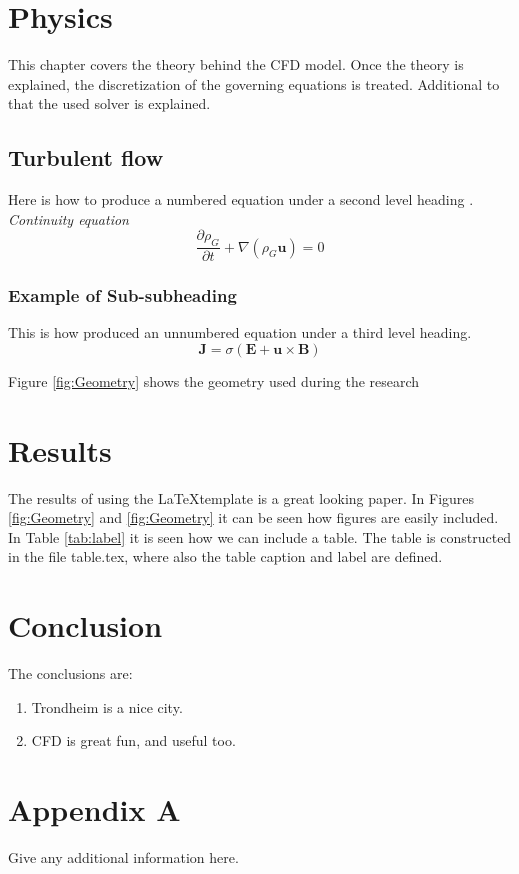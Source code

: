 \documentclass{CFD2017}
\begin{document}
\section{Physics}
This chapter covers the theory behind the CFD model. Once the theory is explained, the discretization of the governing equations is treated. Additional to that the used solver is explained.

\subsection{Turbulent flow}
Here is how to produce a numbered equation under a second level
heading \cite{James1988}.
\vspace{2cm}\\
\emph{Continuity equation}
\begin{equation}
  \frac{\partial \rho_G}{\partial t}+\nabla\left(\rho_G\mathbf
    u\right)=0
\end{equation}

\subsubsection*{Example of Sub-subheading}
This is how \cite{Luke1988} produced an unnumbered equation under a
third level heading.
\begin{equation}
  \mathbf J=\sigma(\mathbf E+\mathbf u\times\mathbf B)
\end{equation}

\newpage

Figure \ref{fig:Geometry} shows the geometry used during the research


\section{Results}
The results of using the \LaTeX template is a great looking paper.
In Figures \ref{fig:Geometry} and \ref{fig:Geometry} it can be seen how figures are easily included.
In Table \ref{tab:label} it is seen how we can include a table.
The table is constructed in the file table.tex, where also the table caption and label are defined.


\newpage
{}

\section{Conclusion}
The conclusions are:
\begin{enumerate}
  \item Trondheim is a nice city.
  \item CFD is great fun, and useful too.
\end{enumerate}






\newpage
\section{Appendix A}
Give any additional information here.
\end{document}
